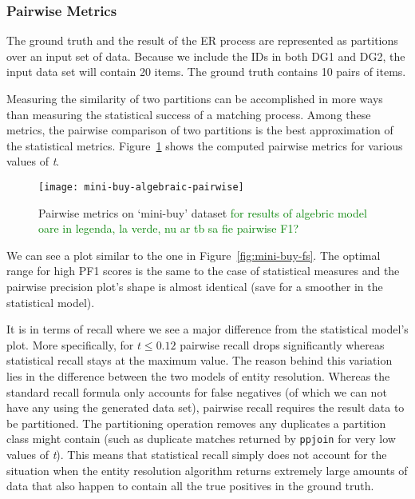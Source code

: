 \subsubsection{Pairwise Metrics}

The ground truth and the result of the ER process are represented as partitions
over an input set of data.
Because we include the IDs in both DG1 and DG2, the input data set will
contain 20 items.
The ground truth contains 10 pairs of items.

Measuring the similarity of two partitions can be accomplished in more ways than
measuring the statistical success of a matching process.
Among these metrics, the pairwise comparison of two partitions is the best
approximation of the statistical metrics\cite{Men10}.
Figure~\ref{fig:mini-alg-pairwise} shows the computed pairwise metrics for
various values of \textit{t}.

\begin{figure}[!h]
    \centering
    \captionsetup{justification=centering}
    \texttt{[image: mini-buy-algebraic-pairwise]}
    \caption{Pairwise metrics on `mini-buy' dataset
    \textcolor{green}{for results of algebric model}\\
    \textcolor{green}{oare in legenda, la verde, nu ar tb sa fie pairwise F1?}
    }
    \label{fig:mini-alg-pairwise}
\end{figure}

We can see a plot similar to the one in Figure~\ref{fig:mini-buy-fs}.
The optimal range for high PF1 scores is the same to the case of statistical measures and the pairwise precision plot's shape
is almost identical (save for a smoother in the statistical model).

It is in terms of recall where we see a major difference from the statistical
model's plot.
More specifically, for $t \le 0.12$ pairwise recall drops significantly whereas
statistical recall stays at the maximum value.
The reason behind this variation lies in the difference between the two models of entity
resolution.
Whereas the standard recall formula only accounts for false negatives (of which
we can not have any using the generated data set), pairwise recall requires the
result data to be partitioned.
The partitioning operation removes any duplicates a partition class might
contain (such as duplicate matches returned by \texttt{ppjoin} for very low
values of \textit{t}).
This means that statistical recall simply does not account for the situation
when the entity resolution algorithm returns extremely large amounts of data
that also happen to contain all the true positives in the ground truth.

